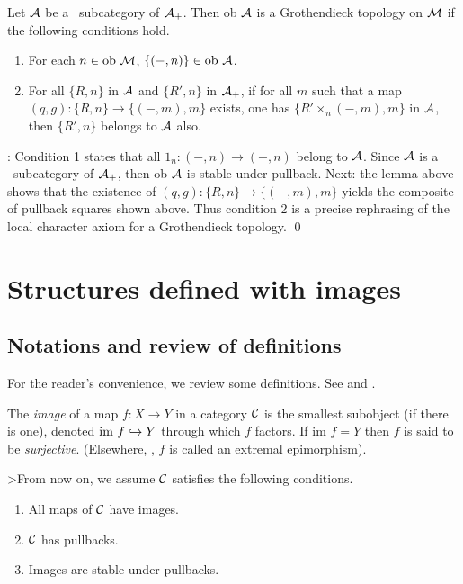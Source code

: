 \begin{thm}
Let ${\bf \cal A}$ be a \SOF\ subcategory of ${\bf \cal A}_+$. Then ob ${\bf \cal A}$ is a 
Grothendieck topology on ${\bf \cal M}$ if the following conditions hold. 
\begin{enumerate} \item For each $n \in \mbox{ob } {\bf \cal M}$, $\{(-,n)\} 
\in \mbox{ob } {\bf \cal A}$.

\item For all $\{R,n\}$ in ${\bf \cal A}$ and $\{R',n\}$ in ${\bf \cal A}_+$, if 
for all $m$ such that a map $(q,g) : \{R,n\} \to \{(-,m),m\}$ exists, 
one has $\{R' \times_n (-,m),m\}$ in ${\bf \cal A}$, then $\{R',n\}$ belongs 
to ${\bf \cal A}$ also.

\end{enumerate}
\end{thm}

: Condition 1 states that all $1_n : (-,n) \to (-,n)$ 
belong to ${\bf \cal A}$. Since ${\bf \cal A}$ is a \SOF\ subcategory of ${\bf \cal A}_+$, 
then ob ${\bf \cal A}$ is stable under pullback. Next: the lemma above shows 
that the existence of $(q,g) : \{R,n\} \to \{(-,m),m\}$ yields the 
composite of pullback squares shown above. Thus condition 2 is a 
precise rephrasing of the local character axiom for a Grothendieck 
topology. \qed

\section{Structures defined with images} 

\subsection{Notations and review of definitions} 
\label{IMAGES}
For the reader's convenience, we review some definitions. See 
\cite{FS} and \cite{regcats}.

The {\em image} of a map $f : X \to Y$ in a category ${\bf \cal C}$ is the 
smallest subobject (if there is one), denoted $\mbox{im } f \hookrightarrow Y$ 
through which $f$ factors. If $\mbox{im } f=Y$ then $f$ is said to be 
{\em surjective}. (Elsewhere, \cite{Borceux}, $f$ is called an 
extremal epimorphism).

>From now on, we assume ${\bf \cal C}$ satisfies the following conditions. 
\begin{DEFN}
\label{IMCAT}
\begin{enumerate}
\item All maps of ${\bf \cal C}$ have images.
\item ${\bf \cal C}$ has pullbacks.
\item Images are stable under pullbacks. \end{enumerate}
\end{DEFN}

